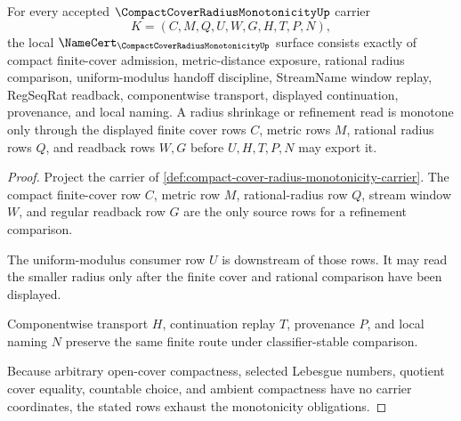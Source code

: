 \begin{theorem}
\label{thm:compact-cover-radius-monotonicity-obligations}
For every accepted $\CompactCoverRadiusMonotonicityUp$ carrier
$$
K=(C,M,Q,U,W,G,H,T,P,N),
$$
the local $\NameCert_{\CompactCoverRadiusMonotonicityUp}$ surface consists exactly of compact finite-cover admission, metric-distance exposure, rational radius comparison, uniform-modulus handoff discipline, StreamName window replay, RegSeqRat readback, componentwise transport, displayed continuation, provenance, and local naming. A radius shrinkage or refinement read is monotone only through the displayed finite cover rows $C$, metric rows $M$, rational radius rows $Q$, and readback rows $W,G$ before $U,H,T,P,N$ may export it.
\end{theorem}
\begin{proof}
Project the carrier of \autoref{def:compact-cover-radius-monotonicity-carrier}. The compact finite-cover row $C$, metric row $M$, rational-radius row $Q$, stream window $W$, and regular readback row $G$ are the only source rows for a refinement comparison.

The uniform-modulus consumer row $U$ is downstream of those rows. It may read the smaller radius only after the finite cover and rational comparison have been displayed.

Componentwise transport $H$, continuation replay $T$, provenance $P$, and local naming $N$ preserve the same finite route under classifier-stable comparison.

Because arbitrary open-cover compactness, selected Lebesgue numbers, quotient cover equality, countable choice, and ambient compactness have no carrier coordinates, the stated rows exhaust the monotonicity obligations.
\end{proof}

